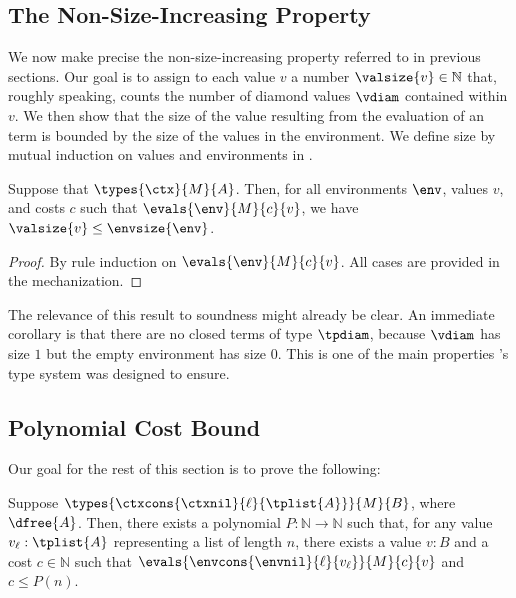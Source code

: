 \subsection{The Non-Size-Increasing Property}
\label{sec:soundness-size}
\enlargethispage{1.7\baselineskip}

We now make precise the non-size-increasing property referred to in previous sections. Our goal is to assign to each value $v$ a number $\valsize{v} \in \mathbb N$ that, roughly speaking, counts the number of diamond values $\vdiam$ contained within $v$.
%
We then show that the size of the value resulting from the evaluation of an \lfplplus term is bounded by the size of the values in the environment. We define size by mutual induction on values and environments in .

\pagebreak


\begin{theorem}
\label{thm:non-size-increasing}
Suppose that $\types{\ctx}{M}{A}$. Then, for all environments $\env$, values $v$, and costs $c$ such that $\evals{\env}{M}{c}{v}$, we have $\valsize{v} \le \envsize{\env}$.
\end{theorem}
\begin{proof}
By rule induction on $\evals{\env}{M}{c}{v}$. All cases are provided in the mechanization.
\end{proof}

The relevance of this result to soundness might already be clear. An immediate corollary is that there are no closed terms of type $\tpdiam$, because $\vdiam$ has size $1$ but the empty environment has size $0$. This is one of the main properties \lfpl's type system was designed to ensure.



\subsection{Polynomial Cost Bound}

Our goal for the rest of this section is to prove the following:

\begin{theorem}
\label{thm:soundness-concrete}
Suppose $\types{\ctxcons{\ctxnil}{\ell}{\tplist{A}}}{M}{B}$, where $\dfree{A}$. Then, there exists a polynomial $P : \mathbb N \to \mathbb N$ such that, for any value $v_\ell : \tplist{A}$ representing a list of length $n$, there exists a value $v : B$ and a cost $c \in \mathbb N$ such that $\evals{\envcons{\envnil}{\ell}{v_\ell}}{M}{c}{v}$ and $c \le P(n)$.
\end{theorem}

